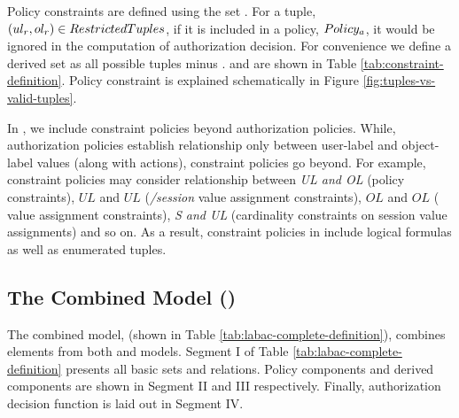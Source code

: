 	


	Policy constraints are defined using the set \textit{\restrictedTuples}.  For a tuple, $(ul_r,ol_r) \in RestrictedTuples$, if it is included in a policy, $Policy_a$, it would be ignored in the computation of authorization decision. For convenience we define a derived set \textit{\policyBound} as all possible tuples minus \textit{\restrictedTuples}. \textit{\restrictedTuples} and \textit{\policyBound} are shown in Table \ref{tab:constraint-definition}. Policy constraint is explained schematically in Figure \ref{fig:tuples-vs-valid-tuples}.
	
	In \consLabac{}, we include constraint policies beyond authorization policies. While, authorization policies establish relationship only between user-label and object-label values (along with actions), constraint policies go beyond. For example, constraint policies may consider relationship between \textit{UL and OL} (policy constraints), $UL$ and $UL$ (\textit{\uLabel/session} value assignment constraints), $OL$ and $OL$ (\textit{\oLabel} value assignment constraints), \textit{S and UL} (cardinality constraints on session value assignments) and so on.  As a result, constraint policies in \eapABAC{} include logical formulas as well as enumerated tuples.
	
	
	
	
	\subsection{The Combined Model (\labacOneOneOne{})}
	
	The combined model, \labacOneOneOne{} (shown in Table \ref{tab:labac-complete-definition}), combines elements from both \hlabac{} and \consLabac{} models.  Segment I of Table \ref{tab:labac-complete-definition} presents all basic sets and relations. Policy components and derived components are shown in Segment II and  III respectively. Finally, authorization decision function is laid out in Segment IV.
	

